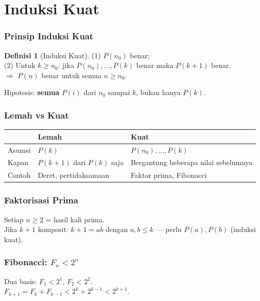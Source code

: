 \documentclass[handout]{beamer}
\theoremstyle{definition}
\newtheorem{definisi}[theorem]{Definisi}
\theoremstyle{example}
\begin{document}
\section{Induksi Kuat}

\begin{frame}
\frametitle{Prinsip Induksi Kuat}
\begin{definisi}[Induksi Kuat]
(1) $P(n_0)$ benar;\\
(2) Untuk $k \geq n_0$: jika $P(n_0),\ldots,P(k)$ benar maka $P(k+1)$ benar.\\
$\Rightarrow$ $P(n)$ benar untuk semua $n \geq n_0$.
\end{definisi}
Hipotesis: \textbf{semua} $P(i)$ dari $n_0$ sampai $k$, bukan hanya $P(k)$.
\end{frame}

\begin{frame}
\frametitle{Lemah vs Kuat}
\begin{center}
\small
\begin{tabular}{|l|l|l|}
\hline
 & \textbf{Lemah} & \textbf{Kuat} \\ \hline
Asumsi & $P(k)$ & $P(n_0),\ldots,P(k)$ \\ \hline
Kapan & $P(k+1)$ dari $P(k)$ saja & Bergantung beberapa nilai sebelumnya \\ \hline
Contoh & Deret, pertidaksamaan & Faktor prima, Fibonacci \\ \hline
\end{tabular}
\end{center}
\end{frame}

\begin{frame}
\frametitle{Faktorisasi Prima}
Setiap $n \geq 2$ = hasil kali prima.\\
Jika $k+1$ komposit: $k+1 = ab$ dengan $a,b \leq k$ --- perlu $P(a), P(b)$ (induksi kuat).
\end{frame}

\begin{frame}
\frametitle{Fibonacci: $F_n < 2^n$}
Dua basis: $F_1 < 2^1$, $F_2 < 2^2$.\\
$F_{k+1} = F_k + F_{k-1} < 2^k + 2^{k-1} < 2^{k+1}$.
\end{frame}

\end{document}
